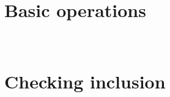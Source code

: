 \section{Basic operations}~\label{sec:operations-tcz}


\section{Checking inclusion}~\label{sec:inclusion-tcz}




